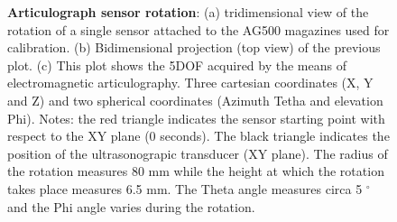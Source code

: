 \begin{figure}
	\caption[Articulograph sensor rotation]{\textbf{Articulograph sensor
	rotation}: (a) tridimensional view of the rotation of a single sensor
	attached to the AG500 magazines used for calibration. 
	(b) Bidimensional projection (top view) of the previous plot.
	(c) This plot shows the 5DOF acquired by the means of electromagnetic 
	articulography. Three cartesian coordinates (X, Y and Z) and two spherical
	coordinates (Azimuth Tetha and elevation Phi).
	Notes: the red triangle indicates the sensor starting point with respect
	to the XY plane (0 seconds). 
	The black triangle indicates the position of the ultrasonograpic 
	transducer (XY plane).
	The radius of the rotation measures 80 mm while the height at which 
	the rotation takes place measures 6.5 mm. The Theta angle measures circa
	5 $^{\circ}$ and the Phi angle varies during the rotation.
	}
	\label{fig:linguometer:technical:interference:ex}
\end{figure}

